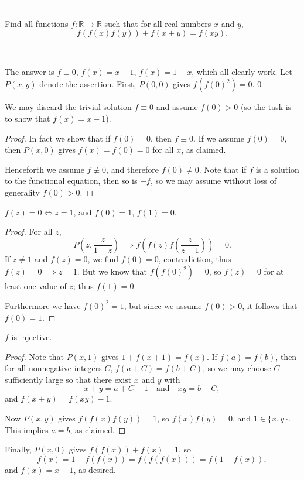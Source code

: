 
---

Find all functions $f:\mathbb R\to\mathbb R$ such that for all real numbers $x$ and $y$, \[f(f(x)f(y))+f(x+y)=f(xy).\]

---

The answer is $f\equiv0$, $f(x)=x-1$, $f(x)=1-x$, which all clearly work. Let $P(x,y)$ denote the assertion. First, $P(0,0)$ gives $f(f(0)^2)=0$.
\setcounter{iclaim}0
\begin{iclaim}
    We may discard the trivial solution $f\equiv0$ and assume $f(0)>0$ (so the task is to show that $f(x)=x-1$).
\end{iclaim}
\begin{proof}
    In fact we show that if $f(0)=0$, then $f\equiv0$. If we assume $f(0)=0$, then $P(x,0)$ gives $f(x)=f(0)=0$ for all $x$, as claimed.

    Henceforth we assume $f\not\equiv0$, and therefore $f(0)\ne0$. Note that if $f$ is a solution to the functional equation, then so is $-f$, so we may assume without loss of generality $f(0)>0$.
\end{proof}
\begin{iclaim}
    $f(z)=0\iff z=1$, and $f(0)=1$, $f(1)=0$.
\end{iclaim}
\begin{proof}
    For all $z$, \[P\left(z,\frac z{1-z}\right)\implies f\left(f(z)f\left(\frac z{z-1}\right)\right)=0.\]
    If $z\ne1$ and $f(z)=0$, we find $f(0)=0$, contradiction, thus $f(z)=0\implies z=1$. But we know that $f(f(0)^2)=0$, so $f(z)=0$ for at least one value of $z$; thus $f(1)=0$.

    Furthermore we have $f(0)^2=1$, but since we assume $f(0)>0$, it follows that $f(0)=1$.
\end{proof}
\begin{iclaim}
    $f$ is injective.
\end{iclaim}
\begin{proof}
    Note that $P(x,1)$ gives $1+f(x+1)=f(x)$. If $f(a)=f(b)$, then for all nonnegative integers $C$, $f(a+C)=f(b+C)$, so we may choose $C$ sufficiently large so that there exist $x$ and $y$ with \[x+y=a+C+1\quad\text{and}\quad xy=b+C,\]
    and $f(x+y)=f(xy)-1$.

    Now $P(x,y)$ gives $f(f(x)f(y))=1$, so $f(x)f(y)=0$, and $1\in\{x,y\}$. This implies $a=b$, as claimed.
\end{proof}

Finally, $P(x,0)$ gives $f(f(x))+f(x)=1$, so \[f(x)=1-f(f(x))=f(f(f(x)))=f(1-f(x)),\]
and $f(x)=x-1$, as desired.

